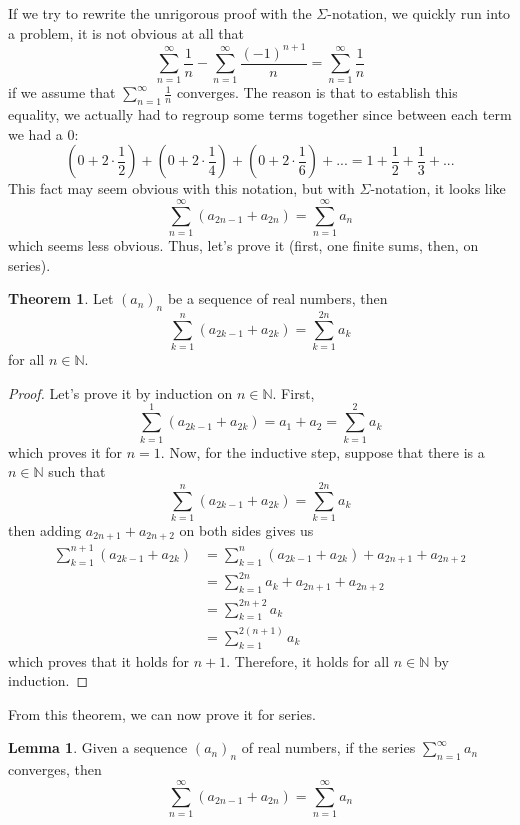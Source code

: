 \documentclass[10pt]{article}
\newcommand{\N}{\mathbb{N}}
\theoremstyle{definition}
\newtheorem*{theorem}{Theorem}
\newtheorem{lemma}{Lemma}
\begin{document}
If we try to rewrite the unrigorous proof with the $\Sigma$-notation, we quickly run into a problem, it is not obvious at all that
$$\sum_{n=1}^{\infty}\frac{1}{n} - \sum_{n=1}^{\infty}\frac{(-1)^{n+1}}{n} = \sum_{n=1}^{\infty}\frac{1}{n}$$
if we assume that $\sum_{n=1}^{\infty}\frac{1}{n}$ converges. The reason is that to establish this equality, we actually had to regroup some terms together since between each term we had a $0$:
$$\left(0 + 2\cdot \frac{1}{2}\right) + \left(0 + 2\cdot \frac{1}{4}\right) + \left(0 + 2\cdot \frac{1}{6}\right) + ... = 1 + \frac{1}{2} + \frac{1}{3}+ ... $$
This fact may seem obvious with this notation, but with $\Sigma$-notation, it looks like
$$\sum_{n=1}^{\infty}(a_{2n-1} + a_{2n}) = \sum_{n=1}^{\infty}a_n$$
which seems less obvious. Thus, let's prove it (first, one finite sums, then, on series).

\begin{theorem}
    Let $(a_n)_n$ be a sequence of real numbers, then
    $$\sum_{k=1}^{n}(a_{2k-1} + a_{2k}) = \sum_{k=1}^{2n}a_k$$
    for all $n \in \N$.
\end{theorem}

\begin{proof}
    Let's prove it by induction on $n \in \N$. First,
    $$\sum_{k=1}^{1}(a_{2k-1} + a_{2k}) = a_1 + a_2 = \sum_{k=1}^{2}a_k$$
    which proves it for $n = 1$. Now, for the inductive step, suppose that there is a $n \in \N$ such that 
    $$\sum_{k=1}^{n}(a_{2k-1} + a_{2k}) = \sum_{k=1}^{2n}a_k$$
    then adding $a_{2n + 1} + a_{2n + 2}$ on both sides gives us
    \begin{align*}
        \sum_{k=1}^{n+1}(a_{2k-1} + a_{2k}) &= \sum_{k=1}^{n}(a_{2k-1} + a_{2k}) + a_{2n + 1} + a_{2n + 2}\\
        &= \sum_{k=1}^{2n}a_k + a_{2n + 1} + a_{2n + 2} \\
        &= \sum_{k=1}^{2n+2}a_k \\
        &= \sum_{k=1}^{2(n+1)}a_k
    \end{align*}
    which proves that it holds for $n+1$. Therefore, it holds for all $n \in \N$ by induction.
\end{proof}

From this theorem, we can now prove it for series.

\begin{lemma}
    Given a sequence $(a_n)_n$ of real numbers, if the series $\sum_{n=1}^{\infty}a_n$ converges, then
    $$\sum_{n=1}^{\infty}(a_{2n-1} + a_{2n}) = \sum_{n=1}^{\infty}a_n$$
\end{lemma}
\end{document}
